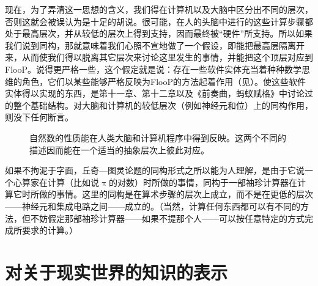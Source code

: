 现在，为了弄清这一思想的含义，我们得在计算机以及大脑中区分出不同的层次，否则这就会被误认为是十足的胡说。很可能，在人的头脑中进行的这些计算步骤都处于最高层次，并从较低的层次上得到支持，因而最终被“硬件”所支持。所以如果我们说到同构，那就意味着我们心照不宣地做了一个假设，即能把最高层隔离开来，从而使我们得以脱离其它层次来讨论这里发生的事情，并能把这个顶层对应到FlooP。说得更严格一些，这个假定就是说：存在一些软件实体充当着种种数学思维的角色，它们以某些能够严格反映为FlooP的方法起着作用（见）。使这些软件实体得以实现的东西，是第十一章、第十二章以及《前奏曲，蚂蚁赋格》中讨论过的整个基础结构。对大脑和计算机的较低层次（例如神经元和位）上的同构作用，则没下任何断言。

\begin{figure}
\caption[联系着自然数、计算机和人脑的同构关系。]
  {自然数的性质能在人类大脑和计算机程序中得到反映。这两个不同的描述因而能在一个适当的抽象层次上彼此对应。}
\end{figure}

如果不拘泥于字面，丘奇—图灵论题的同构形式之所以能为人理解，是由于它说一个心算家在计算（比如说$\uppi$的对数）时所做的事情，同构于一部袖珍计算器在计算它时所做的事情。这里的同构是在算术步骤的层次上成立，而不是在更低的层次——神经元和集成电路之间——成立的。（当然，计算任何东西都可以有不同的方法，但不妨假定那部袖珍计算器——如果不提那个人——可以按任意特定的方式完成所要求的计算。）

\section{对关于现实世界的知识的表示}

